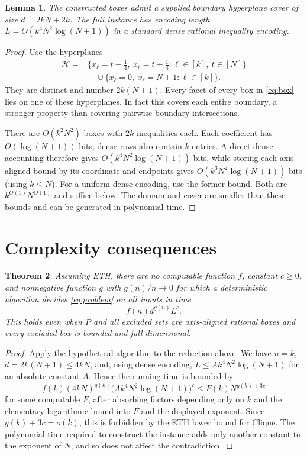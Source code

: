 \documentclass[11pt]{article}
\newtheorem{theorem}{Theorem}
\newtheorem{lemma}[theorem]{Lemma}
\begin{document}
\begin{lemma}\label{lem:cover}
The constructed boxes admit a supplied boundary hyperplane cover of size $d=2kN+2k$. The full instance has encoding length $L=O(k^4N^2\log(N+1))$ in a standard dense rational inequality encoding.
\end{lemma}
\begin{proof}
Use the hyperplanes
\begin{align*}
\mathcal H={}&\{x_\ell=t-\tfrac14,\ x_\ell=t+\tfrac14:
                 \ell\in[k],\ t\in[N]\}\\
&\quad\cup\{x_\ell=0,\ x_\ell=N+1:\ell\in[k]\}.
\end{align*}
They are distinct and number $2k(N+1)$. Every facet of every box in \eqref{eq:box} lies on one of these hyperplanes. In fact this covers each entire boundary, a stronger property than covering pairwise boundary intersections.

There are $O(k^2N^2)$ boxes with $2k$ inequalities each. Each coefficient has $O(\log(N+1))$ bits; dense rows also contain $k$ entries. A direct dense accounting therefore gives $O(k^4N^2\log(N+1))$ bits, while storing each axis-aligned bound by its coordinate and endpoints gives $O(k^3N^2\log(N+1))$ bits (using $k\le N$). For a uniform dense encoding, use the former bound. Both are $k^{O(1)}N^{O(1)}$ and suffice below. The domain and cover are smaller than these bounds and can be generated in polynomial time.
\end{proof}

\section{Complexity consequences}
\begin{theorem}\label{thm:eth}
Assuming ETH, there are no computable function $f$, constant $c\ge0$, and nonnegative function $g$ with $g(n)/n\to0$ for which a deterministic algorithm decides \eqref{eq:problem} on all inputs in time
\[
f(n)d^{g(n)}L^c.
\]
This holds even when $P$ and all excluded sets are axis-aligned rational boxes and every excluded box is bounded and full-dimensional.
\end{theorem}
\begin{proof}
Apply the hypothetical algorithm to the reduction above. We have $n=k$, $d=2k(N+1)\le4kN$, and, using dense encoding, $L\le A k^4N^2\log(N+1)$ for an absolute constant $A$. Hence the running time is bounded by
\[
f(k)(4kN)^{g(k)}\bigl(Ak^4N^2\log(N+1)\bigr)^c
\le F(k)N^{g(k)+3c}
\]
for some computable $F$, after absorbing factors depending only on $k$ and the elementary logarithmic bound into $F$ and the displayed exponent. Since $g(k)+3c=o(k)$, this is forbidden by the ETH lower bound for Clique. The polynomial time required to construct the instance adds only another constant to the exponent of $N$, and so does not affect the contradiction.
\end{proof}
\end{document}
